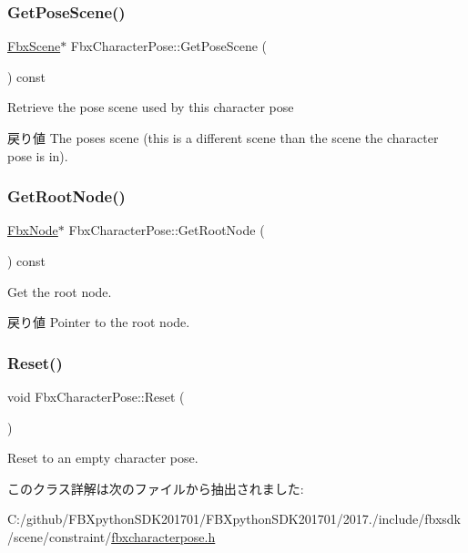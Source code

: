\subsubsection{\texorpdfstring{Get\+Pose\+Scene()}{GetPoseScene()}}
{\footnotesize\ttfamily \hyperlink{class_fbx_scene}{Fbx\+Scene}$\ast$ Fbx\+Character\+Pose\+::\+Get\+Pose\+Scene (\begin{DoxyParamCaption}{ }\end{DoxyParamCaption}) const}

Retrieve the pose scene used by this character pose \begin{DoxyReturn}{戻り値}
The pose\textquotesingle{}s scene (this is a different scene than the scene the character pose is in). 
\end{DoxyReturn}
\mbox{\label{class_fbx_character_pose_a7dd8f39dcef2c74844a3d367a67a681b}} 
\subsubsection{\texorpdfstring{Get\+Root\+Node()}{GetRootNode()}}
{\footnotesize\ttfamily \hyperlink{class_fbx_node}{Fbx\+Node}$\ast$ Fbx\+Character\+Pose\+::\+Get\+Root\+Node (\begin{DoxyParamCaption}{ }\end{DoxyParamCaption}) const}

Get the root node. \begin{DoxyReturn}{戻り値}
Pointer to the root node. 
\end{DoxyReturn}
\mbox{\label{class_fbx_character_pose_ab0aa178aa39799fae44ef3837dfcc9bf}} 
\subsubsection{\texorpdfstring{Reset()}{Reset()}}
{\footnotesize\ttfamily void Fbx\+Character\+Pose\+::\+Reset (\begin{DoxyParamCaption}{ }\end{DoxyParamCaption})}



Reset to an empty character pose. 



このクラス詳解は次のファイルから抽出されました\+:\begin{DoxyCompactItemize}
\item 
C\+:/github/\+F\+B\+Xpython\+S\+D\+K201701/\+F\+B\+Xpython\+S\+D\+K201701/2017./include/fbxsdk/scene/constraint/\hyperlink{fbxcharacterpose_8h}{fbxcharacterpose.\+h}\end{DoxyCompactItemize}
